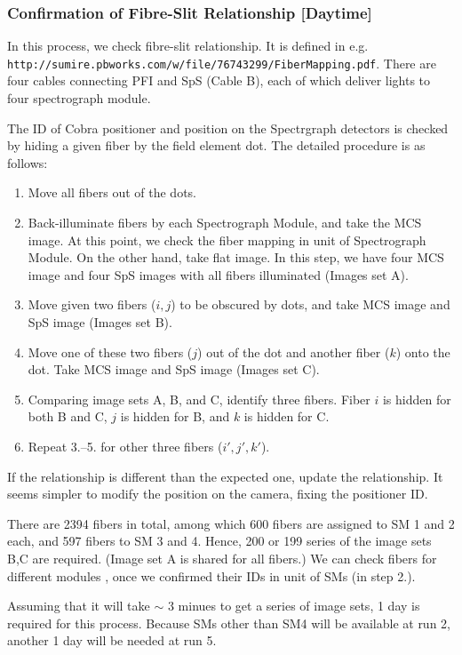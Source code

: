 \subsubsection{Confirmation of Fibre-Slit Relationship [Daytime]}\label{secflow:FibID}

In this process, we check fibre-slit relationship.
It is defined in e.g. \\
 {\tt http://sumire.pbworks.com/w/file/76743299/FiberMapping.pdf}.
There are four cables connecting PFI and SpS (Cable B), each of which deliver lights to four spectrograph module.

The ID of Cobra positioner and position on the Spectrgraph detectors is checked by hiding a given fiber by the field element dot. 
The detailed procedure is as follows:
\begin{enumerate}
\item Move all fibers out of the dots.
\item Back-illuminate fibers by each Spectrograph Module, and take the MCS image.
At this point, we check the fiber mapping in unit of Spectrograph Module. 
On the other hand, take flat image.
In this step, we have four MCS image and four SpS images with all fibers illuminated (Images set A).
\item Move given two fibers ($i, j$) to be obscured by dots, and take MCS image and SpS image (Images set B).
\item Move one of these two fibers ($j$) out of the dot and another fiber ($k$) onto the dot. 
Take MCS image and SpS image (Images set C).
\item Comparing image sets A, B, and C, identify three fibers.
Fiber $i$ is hidden for both B and C, $j$ is hidden for B, and $k$ is hidden for C.
\item Repeat 3.--5. for other three fibers ($i', j', k'$).
\end{enumerate} 
If the relationship is different than the expected one, update the relationship.
It seems simpler to modify the position on the camera, fixing the positioner ID.

There are 2394 fibers in total, among which 600 fibers are assigned to SM 1 and 2 each, and 597 fibers to SM 3 and 4.
Hence, 200 or 199 series of the image sets B,C are required. 
(Image set A is shared for all fibers.)
We can check fibers for different modules , once we confirmed their IDs in unit of SMs (in step 2.).

Assuming that it will take $\sim$ 3 minues to get a series of image sets, 1 day is required for this process.
Because SMs other than SM4 will be available at run 2, another 1 day will be needed at run 5.

